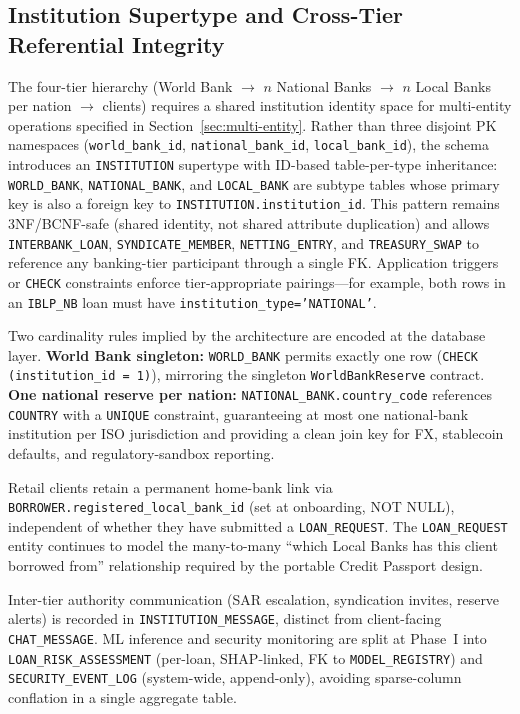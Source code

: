 \documentclass[12pt,a4paper]{report}
\begin{document}
\subsection{Institution Supertype and Cross-Tier Referential Integrity}
\label{sec:institution-supertype}

The four-tier hierarchy (World Bank $\to$ $n$ National Banks $\to$ $n$ Local Banks per nation $\to$ clients) requires a shared institution identity space for multi-entity operations specified in Section~\ref{sec:multi-entity}. Rather than three disjoint PK namespaces (\texttt{world\_bank\_id}, \texttt{national\_bank\_id}, \texttt{local\_bank\_id}), the schema introduces an \texttt{INSTITUTION} supertype with ID-based table-per-type inheritance: \texttt{WORLD\_BANK}, \texttt{NATIONAL\_BANK}, and \texttt{LOCAL\_BANK} are subtype tables whose primary key is also a foreign key to \texttt{INSTITUTION.institution\_id}. This pattern remains 3NF/BCNF-safe (shared identity, not shared attribute duplication) and allows \texttt{INTERBANK\_LOAN}, \texttt{SYNDICATE\_MEMBER}, \texttt{NETTING\_ENTRY}, and \texttt{TREASURY\_SWAP} to reference any banking-tier participant through a single FK. Application triggers or \texttt{CHECK} constraints enforce tier-appropriate pairings---for example, both rows in an \texttt{IBLP\_NB} loan must have \texttt{institution\_type='NATIONAL'}.

Two cardinality rules implied by the architecture are encoded at the database layer. \textbf{World Bank singleton:} \texttt{WORLD\_BANK} permits exactly one row (\texttt{CHECK (institution\_id = 1)}), mirroring the singleton \texttt{WorldBankReserve} contract. \textbf{One national reserve per nation:} \texttt{NATIONAL\_BANK.country\_code} references \texttt{COUNTRY} with a \texttt{UNIQUE} constraint, guaranteeing at most one national-bank institution per ISO jurisdiction and providing a clean join key for FX, stablecoin defaults, and regulatory-sandbox reporting.

Retail clients retain a permanent home-bank link via \texttt{BORROWER.registered\_local\_bank\_id} (set at onboarding, NOT NULL), independent of whether they have submitted a \texttt{LOAN\_REQUEST}. The \texttt{LOAN\_REQUEST} entity continues to model the many-to-many ``which Local Banks has this client borrowed from'' relationship required by the portable Credit Passport design.

Inter-tier authority communication (SAR escalation, syndication invites, reserve alerts) is recorded in \texttt{INSTITUTION\_MESSAGE}, distinct from client-facing \texttt{CHAT\_MESSAGE}. ML inference and security monitoring are split at Phase~I into \texttt{LOAN\_RISK\_ASSESSMENT} (per-loan, SHAP-linked, FK to \texttt{MODEL\_REGISTRY}) and \texttt{SECURITY\_EVENT\_LOG} (system-wide, append-only), avoiding sparse-column conflation in a single aggregate table.
\end{document}
